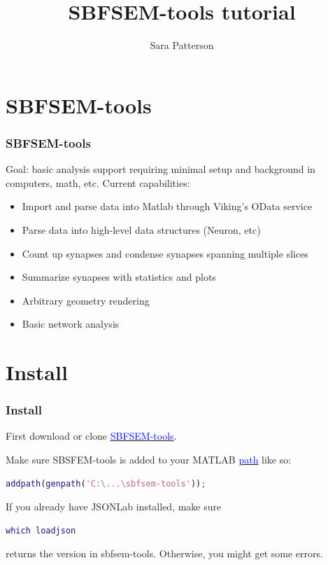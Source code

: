 \documentclass[11pt]{beamer}
\title{SBFSEM-tools tutorial}
\author{Sara Patterson}
\institute{Neitz Lab, University of Washington}
\begin{document}
	\maketitle
\section{SBFSEM-tools}
\begin{frame}
	\frametitle{SBFSEM-tools}
	Goal: basic analysis support requiring minimal setup and background in computers, math, etc.
	\vskip10pt
	Current capabilities:
	\begin{itemize}
		\item Import and parse data into Matlab through Viking's OData service
		\item Parse data into high-level data structures (Neuron, etc)
		\item Count up synapses and condense synapses spanning multiple slices 
		\item Summarize synapses with statistics and plots
		\item Arbitrary geometry rendering
		\item Basic network analysis
	\end{itemize}
\end{frame}
\section{Install}
\begin{frame}[fragile]
	\frametitle{Install}
	First download or clone \href{www.github.com/sarastokes/sbfsem-tools}{\textcolor{blue}{SBFSEM-tools}}.
	
	Make sure SBSFEM-tools is added to your MATLAB \href{https://www.mathworks.com/help/matlab/ref/addpath.html}{\textcolor{blue}{path}} like so:
	\begin{lstlisting}[language=matlab]	
	addpath(genpath('C:\...\sbfsem-tools'));\end{lstlisting}
	If you already have JSONLab installed, make sure 
	\begin{lstlisting}[language=matlab] 
	which loadjson\end{lstlisting} 
	returns the version in sbfsem-tools. Otherwise, you might get some errors.
\end{frame}
\end{document}
